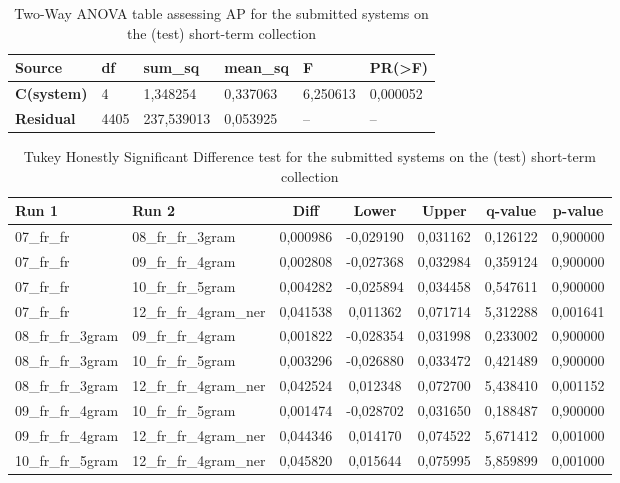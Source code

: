 \begin{table}[h!]
    \centering
    \caption{Two-Way ANOVA table assessing AP for the submitted systems on the (test) short-term collection}
    \label{tab:st_anova}
    \begin{tabular}{|l|l|l|l|l|l|}
    \hline
        \textbf{Source} & \textbf{df} & \textbf{sum\_sq} & \textbf{mean\_sq} & \textbf{F} & \textbf{PR(>F)} \\ \hline\hline
        \textbf{C(system)} & 4 & 1,348254 & 0,337063 & 6,250613 & 0,000052 \\ \hline
        \textbf{Residual} & 4405 & 237,539013 & 0,053925 & -- & -- \\ \hline
    \end{tabular}
\end{table}

\begin{table}[h!]
    \centering
    \caption{Tukey Honestly Significant Difference test for the submitted systems on the (test) short-term collection}
    \label{tab:st_comparison}
    \begin{tabular}{|l|l||c|c|c|c|c|}
        \hline
        \textbf{Run 1} & \textbf{Run 2} & \textbf{Diff} & \textbf{Lower} & \textbf{Upper} & \textbf{q-value} & \textbf{p-value} \\ \hline
        07\_fr\_fr & 08\_fr\_fr\_3gram & 0,000986 & -0,029190 & 0,031162 & 0,126122 & 0,900000 \\ \hline
        07\_fr\_fr & 09\_fr\_fr\_4gram & 0,002808 & -0,027368 & 0,032984 & 0,359124 & 0,900000 \\ \hline
        07\_fr\_fr & 10\_fr\_fr\_5gram & 0,004282 & -0,025894 & 0,034458 & 0,547611 & 0,900000 \\ \hline
        07\_fr\_fr & 12\_fr\_fr\_4gram\_ner & 0,041538 & 0,011362 & 0,071714 & 5,312288 & 0,001641 \\ \hline
        08\_fr\_fr\_3gram & 09\_fr\_fr\_4gram & 0,001822 & -0,028354 & 0,031998 & 0,233002 & 0,900000 \\ \hline
        08\_fr\_fr\_3gram & 10\_fr\_fr\_5gram & 0,003296 & -0,026880 & 0,033472 & 0,421489 & 0,900000 \\ \hline
        08\_fr\_fr\_3gram & 12\_fr\_fr\_4gram\_ner & 0,042524 & 0,012348 & 0,072700 & 5,438410 & 0,001152 \\ \hline
        09\_fr\_fr\_4gram & 10\_fr\_fr\_5gram & 0,001474 & -0,028702 & 0,031650 & 0,188487 & 0,900000 \\ \hline
        09\_fr\_fr\_4gram & 12\_fr\_fr\_4gram\_ner & 0,044346 & 0,014170 & 0,074522 & 5,671412 & 0,001000 \\ \hline
        10\_fr\_fr\_5gram & 12\_fr\_fr\_4gram\_ner & 0,045820 & 0,015644 & 0,075995 & 5,859899 & 0,001000 \\ \hline
    \end{tabular}
\end{table}

